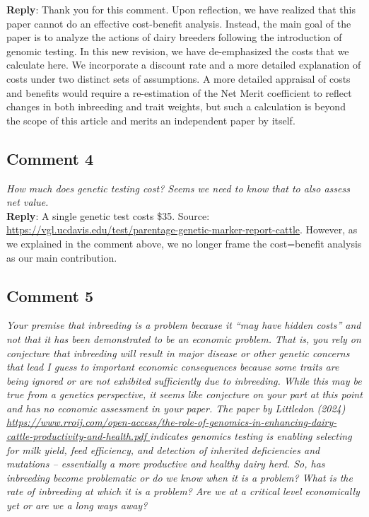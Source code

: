 \documentclass[12pt,letterpaper]{article}
\begin{document}
\textbf{Reply}: Thank you for this comment. Upon reflection, we have realized that this paper cannot do an effective cost-benefit analysis. Instead, the main goal of the paper is to analyze the actions of dairy breeders following the introduction of genomic testing. In this new revision, we have de-emphasized the costs that we calculate here. We incorporate a discount rate and a more detailed explanation of costs under two distinct sets of assumptions. A more detailed appraisal of costs and benefits would require a re-estimation of the Net Merit coefficient to reflect changes in both inbreeding and trait weights, but such a calculation is beyond the scope of this article and merits an independent paper by itself.


\subsection*{Comment 4}
{\it How much does genetic testing cost? Seems we need to know that to also assess net value.} \\

\textbf{Reply}: A single genetic test costs \$35. Source:
\url{https://vgl.ucdavis.edu/test/parentage-genetic-marker-report-cattle}. However, as we explained in the comment above, we no longer frame the cost=benefit analysis as our main contribution.

\subsection*{Comment 5}
{\it Your premise that inbreeding is a problem because it “may have hidden costs” and not that it has been demonstrated to be an economic problem. That is, you rely on conjecture that inbreeding will result in major disease or other genetic concerns that lead I guess to important economic consequences because some traits are being ignored or are not exhibited sufficiently due to inbreeding. While this may be true from a genetics perspective, it seems like conjecture on your part at this point and has no economic assessment in your paper. The paper by Littledon (2024) \url{https://www.rroij.com/open-access/the-role-of-genomics-in-enhancing-dairy-cattle-productivity-and-health.pdf }  indicates genomics testing is enabling selecting for milk yield, feed efficiency, and detection of inherited deficiencies and mutations – essentially a more productive and healthy dairy herd. So, has inbreeding become problematic or do we know when it is a problem? What is the rate of inbreeding at which it is a problem? Are we at a critical level economically yet or are we a long ways away?}  \\
\end{document}
